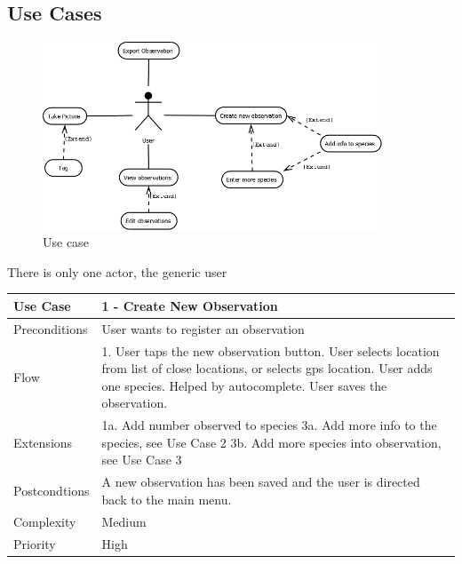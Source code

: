 \subsection{Use Cases}
\begin{figure}[htb]
	\centering
	\includegraphics[width=0.9\textwidth]{reqspec/UseCase.png}
	\caption{Use case}
	\label{fig:usecase}
\end{figure}

There is only one actor, the generic user

\begin{tabular}[t]{|l|p{}|}\hline
Use Case&1 - Create New Observation\\\hline
Preconditions&User wants to register an observation\\\hline
Flow&1. User taps the new observation button\newline
2. User selects location from list of close locations, or selects gps location\newline
3. User adds one species. Helped by autocomplete\newline
4. User saves the observation.\\\hline
Extensions& 1a. Add number observed to species\newline
3a. Add more info to the species, see Use Case 2\newline
3b. Add more species into observation, see Use Case 3\\\hline
Postcondtions&A new observation has been saved and the user is directed back to the main menu.\\\hline
Complexity&Medium\\\hline
Priority&High\\\hline
\end{tabular}

\hspace{2em}

